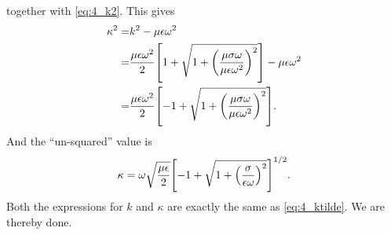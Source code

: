 \documentclass[11pt,letter, swedish, english
]{article}
\begin{document}
together with \eqref{eq:4_k2}. This gives
\begin{equation}
\begin{aligned}
\kappa^2 =& k^2-\mu\epsilon\omega^2\\
=&\frac{\mu\epsilon\omega^2}{2}
\qty[ 1 +\sqrt{
1+ \qty(\frac{\mu\sigma\omega}{\mu\epsilon\omega^2})^2
} ]
-\mu\epsilon\omega^2\\
=&\frac{\mu\epsilon\omega^2}{2}
\qty[ -1 +\sqrt{
1+ \qty(\frac{\mu\sigma\omega}{\mu\epsilon\omega^2})^2
} ].
\end{aligned}
\end{equation}
And the ``un-squared'' value is
\begin{equation}
\kappa = \omega\sqrt{\frac{\mu\epsilon}{2}}
\qty[ -1 +\sqrt{
1+ \qty(\frac{\sigma}{\epsilon\omega})^2
} ]^{1/2}.
\end{equation}
Both the expressions for $k$ and $\kappa$ are exactly the same as
\eqref{eq:4_ktilde}. We are thereby done.
\end{document}
